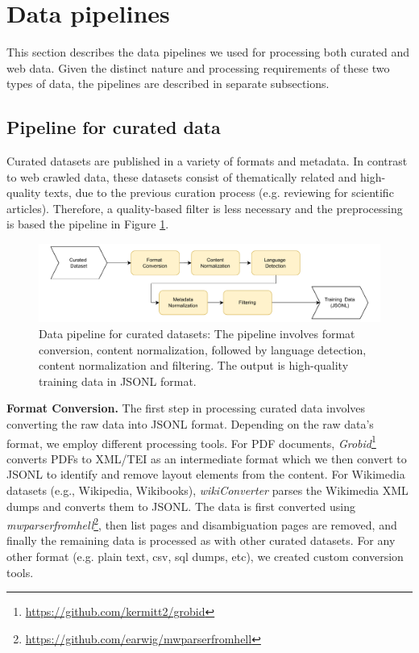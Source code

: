 \section{Data pipelines}
\label{sec:pipelines}

This section describes the data pipelines we used for processing both curated and web data. Given the distinct nature and processing requirements of these two types of data, the pipelines are described in separate subsections.

\subsection{Pipeline for curated data}
\label{sec:pipelines.curated}

Curated datasets are published in a variety of formats and metadata. In contrast to web crawled data, these datasets consist of thematically related and high-quality texts, due to the previous curation process (e.g. reviewing for scientific articles). Therefore, a quality-based filter is less necessary and the preprocessing is based the pipeline in Figure \ref{fig:curated_pipeline}.

\begin{figure}[ht]
    \centering
    \includegraphics[width=\linewidth]{images/Curated_v4.drawio.pdf}
    \caption{\label{fig:curated_pipeline}%
    Data pipeline for curated datasets: The pipeline involves format conversion, content normalization, followed by language detection, content normalization and filtering. The output is high-quality training data in JSONL format.}
\end{figure}


\textbf{Format Conversion.}
The first step in processing curated data involves converting the raw data into JSONL format. Depending on the raw data's format, we employ different processing tools. For PDF documents, \textit{Grobid}\footnote{\url{https://github.com/kermitt2/grobid}} converts PDFs to XML/TEI as an intermediate format which we then convert to JSONL to identify and remove layout elements from the content. 
For Wikimedia datasets (e.g., Wikipedia, Wikibooks), \textit{wikiConverter} parses the Wikimedia XML dumps and converts them to JSONL. The data is first converted using \textit{mwparserfromhell}\footnote{\url{https://github.com/earwig/mwparserfromhell}}, then list pages and disambiguation pages are removed, and finally the remaining data is processed as with other curated datasets. 
For any other format (e.g. plain text, csv, sql dumps, etc), we created custom conversion tools.

